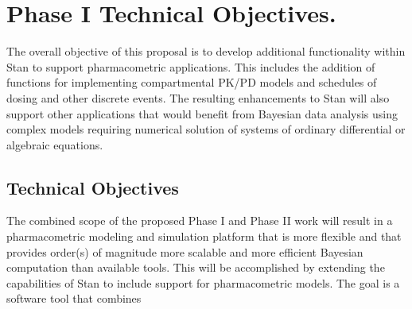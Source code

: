 \documentclass[11pt]{nih2016}
\begin{document}

\section{Phase I Technical Objectives.}


The overall objective of this proposal is to develop additional
functionality within Stan to support pharmacometric applications. This
includes the addition of functions for implementing compartmental PK/PD
models and schedules of dosing and other discrete events. The
resulting enhancements to Stan will also support other applications
that would benefit from Bayesian data analysis using complex models
requiring numerical solution of systems of ordinary differential or
algebraic equations.

\subsection{Technical Objectives}

The combined scope of the proposed Phase I and Phase II work will
result in a pharmacometric modeling and simulation platform that is
more flexible and that provides order(s) of magnitude more scalable
and more efficient Bayesian computation than available tools. This
will be accomplished by extending the capabilities of Stan to include
support for pharmacometric models. The goal is a software tool that
combines 
\end{document}
